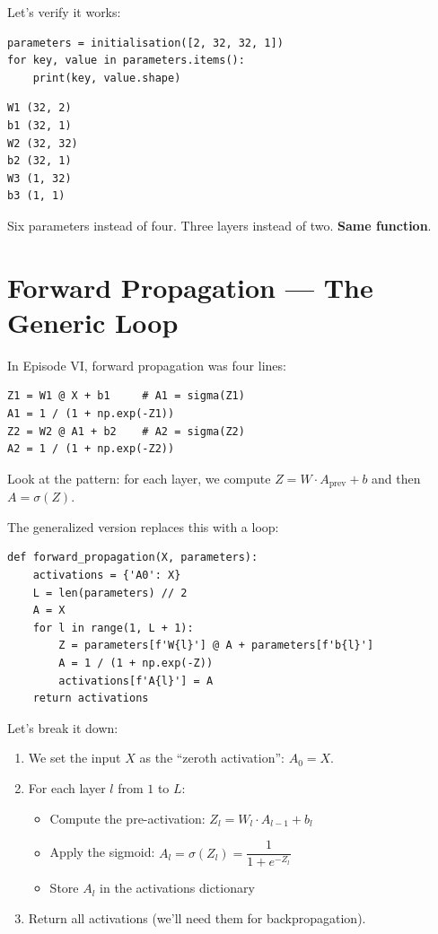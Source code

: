 \documentclass[11pt]{article}
\begin{document}
Let's verify it works:

\begin{lstlisting}
parameters = initialisation([2, 32, 32, 1])
for key, value in parameters.items():
    print(key, value.shape)
\end{lstlisting}

\begin{resultbox}[title=Output]
\begin{verbatim}
W1 (32, 2)
b1 (32, 1)
W2 (32, 32)
b2 (32, 1)
W3 (1, 32)
b3 (1, 1)
\end{verbatim}
\end{resultbox}

Six parameters instead of four. Three layers instead of two. \textbf{Same function}.


\section{Forward Propagation --- The Generic Loop}

In Episode VI, forward propagation was four lines:

\begin{lstlisting}[title={\small Episode VI --- Hardcoded}]
Z1 = W1 @ X + b1     # A1 = sigma(Z1)
A1 = 1 / (1 + np.exp(-Z1))
Z2 = W2 @ A1 + b2    # A2 = sigma(Z2)
A2 = 1 / (1 + np.exp(-Z2))
\end{lstlisting}

Look at the pattern: for each layer, we compute $Z = W \cdot A_{\text{prev}} + b$ and then $A = \sigma(Z)$.

The generalized version replaces this with a loop:

\begin{lstlisting}[title={\small Episode VII --- Any depth}]
def forward_propagation(X, parameters):
    activations = {'A0': X}
    L = len(parameters) // 2
    A = X
    for l in range(1, L + 1):
        Z = parameters[f'W{l}'] @ A + parameters[f'b{l}']
        A = 1 / (1 + np.exp(-Z))
        activations[f'A{l}'] = A
    return activations
\end{lstlisting}

Let's break it down:

\begin{enumerate}
  \item We set the input $X$ as the ``zeroth activation'': $A_0 = X$.
  \item For each layer $l$ from $1$ to $L$:
  \begin{itemize}
    \item Compute the pre-activation: $Z_l = W_l \cdot A_{l-1} + b_l$
    \item Apply the sigmoid: $A_l = \sigma(Z_l) = \dfrac{1}{1 + e^{-Z_l}}$
    \item Store $A_l$ in the activations dictionary
  \end{itemize}
  \item Return all activations (we'll need them for backpropagation).
\end{enumerate}
\end{document}
